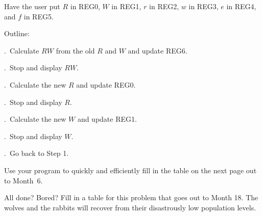 \noindent Have the user put $R$ in REG0, $W$ in REG1, $r$ in REG2, $w$ in REG3, $e$ in REG4, and $f$ in REG5.

\bigskip

\noindent Outline:

\bigskip

.~Calculate $RW$ from the old $R$ and $W$ and update REG6.

.~Stop and display $RW$.

.~Calculate the new $R$ and update REG0.

.~Stop and display $R$.

.~Calculate the new $W$ and update REG1.

.~Stop and display $W$.

.~Go back to Step 1.

\bigskip

\noindent Use your program to quickly and efficiently fill in the table on the next page out to Month~6.

\bigskip

\noindent All done? Bored? Fill in a table for this problem that goes out to Month 18. The wolves and the rabbits will recover from their disastrously low population levels.

\bye
